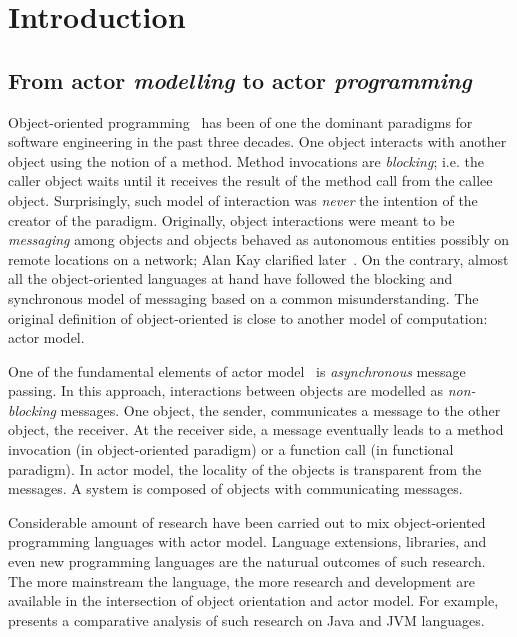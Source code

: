 
\chapter[Introduction]{Introduction}
\label{ch:intro}

\section{From actor \emph{modelling} to actor \emph{programming}}
\label{sec:intro:abs}

Object-oriented programming~\cite{booch1982object,meyer1988object} has been of one the dominant paradigms for software engineering in the past three decades.
One object interacts with another object using the notion of a method.
Method invocations are \emph{blocking}; i.e. the caller object waits until it receives the result of the method call from the callee object.
Surprisingly, such model of interaction was \emph{never} the intention of the creator of the paradigm.
Originally, object interactions were meant to be \emph{messaging} among objects and objects behaved as autonomous entities possibly on remote locations on a network; Alan Kay clarified later~\cite{alank1,alank2}. 
On the contrary, almost all the object-oriented languages at hand have followed the blocking and synchronous model of messaging based on a common misunderstanding. 
The original definition of object-oriented is close to another model of computation: actor model.  

One of the fundamental elements of actor model~\cite{actors:agha,agha97} is \emph{asynchronous} message passing.
In this approach, interactions between objects are modelled as \emph{non-blocking} messages.
One object, the sender, communicates a message to the other object, the receiver.
At the receiver side, a message eventually leads to a method invocation (in  object-oriented paradigm) or a function call (in functional paradigm).
In actor model, the locality of the objects is transparent from the messages.
A system is composed of objects with communicating messages.

Considerable amount of research have been carried out to mix object-oriented programming languages with actor model. 
Language extensions, libraries, and even new programming languages are the naturual outcomes of such research.
The more mainstream the language, the more research and development are available in the intersection of object orientation and actor model.
For example, \cite{actor_frameworks_jvm:agha} presents a comparative analysis of such research on Java and JVM languages.

